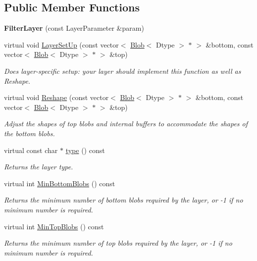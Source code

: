 \subsection*{Public Member Functions}
\begin{DoxyCompactItemize}
\item 
{\bfseries Filter\+Layer} (const Layer\+Parameter \&param)\hypertarget{classcaffe_1_1FilterLayer_a7384a8e15c84b16b46b775a11b95cc4f}{}\label{classcaffe_1_1FilterLayer_a7384a8e15c84b16b46b775a11b95cc4f}

\item 
virtual void \hyperlink{classcaffe_1_1FilterLayer_acbbb4dd26fd8a5ab01bce9aa34ad12ae}{Layer\+Set\+Up} (const vector$<$ \hyperlink{classcaffe_1_1Blob}{Blob}$<$ Dtype $>$ $\ast$ $>$ \&bottom, const vector$<$ \hyperlink{classcaffe_1_1Blob}{Blob}$<$ Dtype $>$ $\ast$ $>$ \&top)
\begin{DoxyCompactList}\small\item\em Does layer-\/specific setup\+: your layer should implement this function as well as Reshape. \end{DoxyCompactList}\item 
virtual void \hyperlink{classcaffe_1_1FilterLayer_a38ca56415d59b1d89c8fd4b4b25da2de}{Reshape} (const vector$<$ \hyperlink{classcaffe_1_1Blob}{Blob}$<$ Dtype $>$ $\ast$ $>$ \&bottom, const vector$<$ \hyperlink{classcaffe_1_1Blob}{Blob}$<$ Dtype $>$ $\ast$ $>$ \&top)
\begin{DoxyCompactList}\small\item\em Adjust the shapes of top blobs and internal buffers to accommodate the shapes of the bottom blobs. \end{DoxyCompactList}\item 
virtual const char $\ast$ \hyperlink{classcaffe_1_1FilterLayer_aaca9f27ee4bc34889817256ed643d433}{type} () const \hypertarget{classcaffe_1_1FilterLayer_aaca9f27ee4bc34889817256ed643d433}{}\label{classcaffe_1_1FilterLayer_aaca9f27ee4bc34889817256ed643d433}

\begin{DoxyCompactList}\small\item\em Returns the layer type. \end{DoxyCompactList}\item 
virtual int \hyperlink{classcaffe_1_1FilterLayer_a13119969cca3f6d1b4b3fea77619d595}{Min\+Bottom\+Blobs} () const 
\begin{DoxyCompactList}\small\item\em Returns the minimum number of bottom blobs required by the layer, or -\/1 if no minimum number is required. \end{DoxyCompactList}\item 
virtual int \hyperlink{classcaffe_1_1FilterLayer_abae0953d9773e25b7cfc5bdea4f6230a}{Min\+Top\+Blobs} () const 
\begin{DoxyCompactList}\small\item\em Returns the minimum number of top blobs required by the layer, or -\/1 if no minimum number is required. \end{DoxyCompactList}\end{DoxyCompactItemize}
